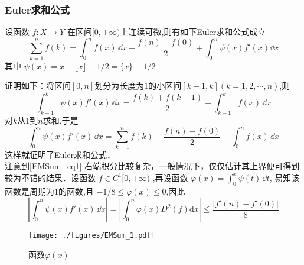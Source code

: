 
\subsubsection{Euler求和公式}
\begin{theorem}{}
设函数 $f:X\to Y$ 在区间$[0,+\infty)$上连续可微,则有如下Euler求和公式成立	
        \begin{equation}\label{EMSum_eq1} 
            \sum_{k=1}^{n}f(k)=\int_{0}^{n}f(x)\,\dd x
            +\frac{f(n)-f(0)}{2}+\int_{0}^{n}\psi(x)f'(x)\dd x
        \end{equation}
    其中 $\psi(x)=x-\lfloor x \rfloor-1/2=\{x\}-1/2$
\end{theorem}
证明如下：将区间$[0,n]$划分为长度为$1$的小区间$[k-1,k](k=1,2,\cdots,n)$,则
​\[
    \int_{k-1}^{k}\psi(x)f'(x)\,\dd x
    =\frac{f(k)+f(k-1)}{2}-\int_{k-1}^{k}f(x)\,\dd x
\]
​对$k$从1到$n$求和,于是
​\[
    \int_{0}^{n}\psi(x)f'(x)\,\dd x
    =\sum_{k=1}^{n}f(k)-\frac{f(n)-f(0)}{2}-\int_{0}^{n}f(x)\,\dd x
\]
这样就证明了Euler求和公式．
\\注意到\autoref{EMSum_eq1} 右端积分比较复杂，一般情况下，仅仅估计其上界便可得到较为不错的结果．设函数 $f\in{C^1[0,+\infty)}$ ,再设函数
$\varphi(x)=\displaystyle{\int_{0}^{x}\psi(t)\,\dd t}$,
易知该函数是周期为$1$的函数,且
 $-1/8\leqslant\varphi(x)\leqslant 0$,因此
\[
    \left|\int_{0}^{n}\psi(x)f'(x)\,\dd x\right|
    =\left|\int_{0}^{n}\varphi(x)D^2(f)\mathrm{d}x\right|
    \leqslant\frac{|f'(n)-f'(0)|}{8}
\]
\begin{figure}[ht]
\centering
\texttt{[image: ./figures/EMSum\_1.pdf]}
\caption{函数$\varphi(x)$} \label{EMSum_fig1}
\end{figure}

